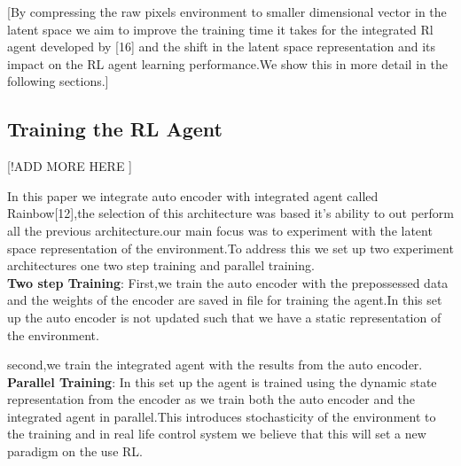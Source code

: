 [By compressing the raw pixels environment to smaller dimensional vector in the latent space we aim to improve the training time it takes for the integrated Rl agent developed by [16] and the shift in the latent space representation and its impact on the RL agent learning performance.We show this in more detail in the following sections.]


\subsection{Training the RL Agent} [!ADD MORE HERE ]

In this paper we integrate auto encoder with integrated agent called Rainbow[12],the selection of this architecture  was based it's ability to out perform all the previous architecture.our main focus was to experiment with the latent space representation of the environment.To address this we set up two experiment architectures one two step training and parallel training.\\

\textbf{Two step Training}: First,we train the auto encoder with the prepossessed data and the weights of the encoder are saved in file for training the agent.In this set up the auto encoder is not updated such that we have a static representation of the environment.

second,we train the integrated agent with the results from the auto encoder.\\

\textbf{Parallel Training}:
In this set up the agent is trained using the dynamic state representation from the encoder as we train both the auto encoder and the integrated agent in parallel.This introduces stochasticity of the environment to the training  and in real life control system we believe that this will set a new paradigm on the use RL.







